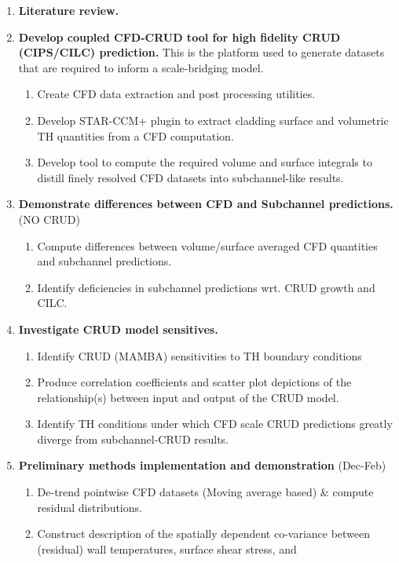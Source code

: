 \documentclass[10pt,a4paper]{report}
\begin{document}
\begin{enumerate}
\item \textbf{Literature review.}
\item \textbf{Develop coupled CFD-CRUD tool for high fidelity CRUD (CIPS/CILC) prediction.}  
          This is the platform used to generate datasets that are
          required to inform a scale-bridging model.
    \begin{enumerate}
        \item Create CFD data extraction and post processing utilities.
        \item Develop STAR-CCM+ plugin to extract cladding surface and volumetric TH quantities from a CFD computation.
        \item Develop tool to compute the required volume and surface integrals to
              distill finely resolved CFD datasets into subchannel-like results.
    \end{enumerate}
\item \textbf{Demonstrate differences between CFD and Subchannel predictions.} (NO CRUD)
    \begin{enumerate}
        \item Compute differences between volume/surface averaged CFD quantities and subchannel predictions.
        \item Identify deficiencies in subchannel predictions wrt. CRUD growth and CILC.
    \end{enumerate}
\item \textbf{Investigate CRUD model sensitives.}
    \begin{enumerate}
        \item Identify CRUD (MAMBA) sensitivities to TH boundary conditions
        \item Produce correlation coefficients and scatter plot depictions of the relationship(s) between input
              and output of the CRUD model.
        \item Identify TH conditions under which CFD scale CRUD predictions greatly diverge from subchannel-CRUD results.
    \end{enumerate}
\item \textbf{Preliminary methods implementation and demonstration} (Dec-Feb)
    \begin{enumerate}
        \item De-trend pointwise CFD datasets (Moving average based) \& compute residual distributions.
        \item Construct description of the spatially dependent co-variance between (residual) wall temperatures, surface shear stress, and

\end{enumerate}
\end{enumerate}
\end{document}
